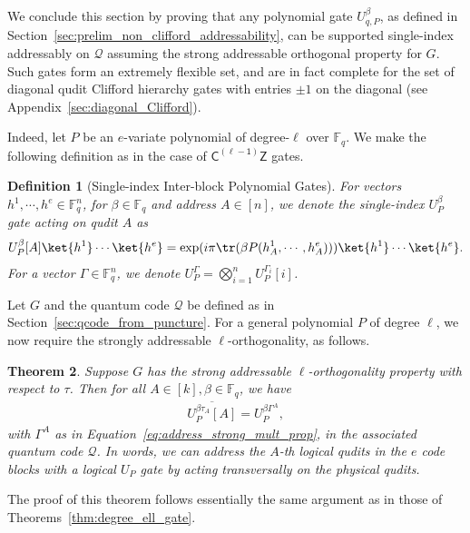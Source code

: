\documentclass[11pt]{article}
\newtheorem{theorem}{Theorem}[section]
\newtheorem{definition}[theorem]{Definition}
\theoremstyle{definition}
\newcommand{\CLZ}{\mathsf{C^{(\ell-1)}Z}}
\newcommand{\qcode}{\mathcal{Q}}
\newcommand{\FF}{\mathbb{F}}
\newcommand*{\ol}{\overline}
\begin{document}
We conclude this section by proving that any polynomial gate $U_{q,P}^\beta$, as defined in Section~\ref{sec:prelim_non_clifford_addressability}, can be supported single-index addressably on $\qcode$ assuming the strong addressable orthogonal property for $G$. Such gates form an extremely flexible set, and are in fact complete for the set of diagonal qudit Clifford hierarchy gates with entries $\pm 1$ on the diagonal (see Appendix~\ref{sec:diagonal_Clifford}).

Indeed, let $P$ be an $e$-variate polynomial of degree-$\ell$ over $\mathbb{F}_q$.
We make the following definition as in the case of $\CLZ$ gates.
\begin{definition}[Single-index Inter-block Polynomial Gates]
    For vectors $h^1, \cdots, h^e\in \FF_q^n$, for $\beta\in \FF_q$ and address $A\in [n]$, we denote the single-index $U_P^\beta$ gate acting on qudit $A$ as 
    \begin{align}
        U_P^\beta[A]\ket{h^1}\cdots\ket{h^e} = \exp(i\pi\tr( \beta P(h^1_A, \cdots, h^e_A)))\ket{h^1}\cdots\ket{h^e}.
    \end{align}
    For a vector $\Gamma \in\FF_q^n$, we denote $U_P^\Gamma = \bigotimes_{i=1}^n U_P^{\Gamma_i}[i]$. 
\end{definition}

Let $G$ and the quantum code $\qcode$ be defined as in Section~\ref{sec:qcode_from_puncture}. For a general polynomial $P$ of degree $\ell$, we now require the strongly addressable $\ell$-orthogonality, as follows.

\begin{theorem}\label{thm:polynomial_gate_addressing}
Suppose $G$ has the strong addressable $\ell$-orthogonality property with respect to $\tau$. Then for all $A \in [k], \beta \in \mathbb{F}_q$, we have
\begin{align}
    \ol{U_P^{\beta\tau_A}[A]} = U_P^{\beta\Gamma^A},
\end{align}
with $\Gamma^A$ as in Equation~\eqref{eq:address_strong_mult_prop}, in the associated quantum code $\qcode$. In words, we can address the $A$-th logical qudits in the $e$ code blocks with a logical $U_P$ gate by acting transversally on the physical qudits.
\end{theorem}
The proof of this theorem follows essentially the same argument as in those of Theorems~\ref{thm:degree_ell_gate}.
\end{document}
